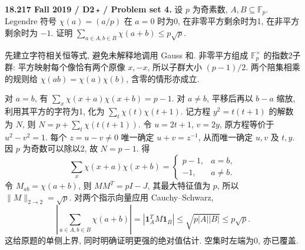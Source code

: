 \begin{exercise}\label{mit:18217-d2}
\textbf{18.217 Fall 2019 / D2\,$\star$ / Problem set 4.}
设 $p$ 为奇素数, $A,B\subseteq\mathbb F_p$. Legendre 符号 $\chi(a)=(a/p)$ 在 $a=0$ 时为0, 在非零平方剩余时为1, 在非平方剩余时为 $-1$. 证明
$\sum_{a\in A,b\in B}\chi(a+b)\le p\sqrt p$.
\end{exercise}
\begin{solution}
先建立字符相关恒等式, 避免未解释地调用 Gauss 和. 非零平方组成 $\mathbb F_p^\times$ 的指数2子群: 平方映射每个像恰有两个原像 $x,-x$, 所以子群大小 $(p-1)/2$. 两个陪集相乘的规则给 $\chi(ab)=\chi(a)\chi(b)$, 含零的情形亦成立.

对 $a=b$, 有 $\sum_x\chi(x+a)\chi(x+b)=p-1$. 对 $a\ne b$, 平移后再以 $b-a$ 缩放, 利用其平方的字符为1, 化为 $\sum_t\chi(t)\chi(t+1)$. 记方程 $y^2=t(t+1)$ 的解数为 $N$, 则
$N=p+\sum_t\chi(t(t+1))$.
令 $u=2t+1$, $v=2y$, 原方程等价于 $u^2-v^2=1$. 每个 $z=u-v\ne0$ 唯一确定 $u+v=z^{-1}$, 从而唯一确定 $u,v$ 及 $t,y$. 因 $p$ 为奇数可以除以2, 故 $N=p-1$. 得
\[
\sum_x\chi(x+a)\chi(x+b)=
\begin{cases}p-1,&a=b,\\-1,&a\ne b.\end{cases}
\]
令 $M_{ab}=\chi(a+b)$, 则 $MM^T=pI-J$, 其最大特征值为 $p$, 所以 $\|M\|_{2\to2}=\sqrt p$. 对两个指示向量应用 Cauchy--Schwarz,
\[
\left|\sum_{a\in A,b\in B}\chi(a+b)\right|
=|\mathbf1_A^TM\mathbf1_B|
\le\sqrt{p|A||B|}\le p\sqrt p.
\]
这给原题的单侧上界, 同时明确证明更强的绝对值估计. 空集时左端为0, 亦已覆盖.
\end{solution}

